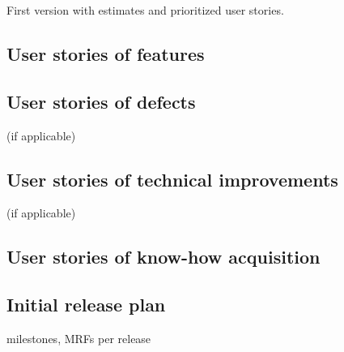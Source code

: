 First version with estimates and prioritized user stories.
		\subsection{User stories of features}
		\subsection{User stories of defects}
			(if applicable)
		\subsection{User stories of technical improvements}
			(if applicable)
		\subsection{User stories of know-how acquisition}
		\subsection{Initial release plan}
			milestones, MRFs per release